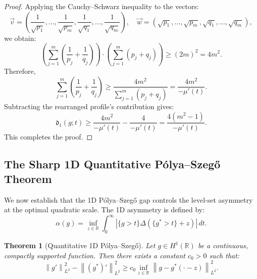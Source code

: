 \documentclass[11pt]{article}
\newtheorem{theorem}{Theorem}[section]
\theoremstyle{definition}
\newcommand{\R}{\mathbb R}
\newcommand{\norm}[1]{\left\|#1\right\|}
\newcommand{\abs}[1]{\left|#1\right|}
\begin{document}
\begin{proof}
Applying the Cauchy--Schwarz inequality to the vectors:
\begin{equation}
\vec{v} = \left( \frac{1}{\sqrt{p_1}}, \dots, \frac{1}{\sqrt{p_m}}, \frac{1}{\sqrt{q_1}}, \dots, \frac{1}{\sqrt{q_m}} \right), \quad \vec{w} = \left( \sqrt{p_1}, \dots, \sqrt{p_m}, \sqrt{q_1}, \dots, \sqrt{q_m} \right),
\end{equation}
we obtain:
\begin{equation}
\left( \sum_{j=1}^m \left( \frac{1}{p_j} + \frac{1}{q_j} \right) \right) \cdot \left( \sum_{j=1}^m (p_j + q_j) \right) \ge (2m)^2 = 4m^2.
\end{equation}
Therefore,
\begin{equation}
\sum_{j=1}^m \left( \frac{1}{p_j} + \frac{1}{q_j} \right) \ge \frac{4m^2}{\sum_{j=1}^m (p_j + q_j)} = \frac{4m^2}{-\mu'(t)}.
\end{equation}
Subtracting the rearranged profile's contribution gives:
\begin{equation}
\mathfrak{d}_1(g; t) \ge \frac{4m^2}{-\mu'(t)} - \frac{4}{-\mu'(t)} = \frac{4(m^2 - 1)}{-\mu'(t)}.
\end{equation}
This completes the proof.
\end{proof}

\subsection{The Sharp 1D Quantitative Pólya--Szegő Theorem}

We now establish that the 1D Pólya--Szegő gap controls the level-set asymmetry at the optimal quadratic scale. The 1D asymmetry is defined by:
\begin{equation}
\alpha(g) = \inf_{z\in\R} \int_0^\infty \abs{ \{g > t\} \Delta ( \{g^* > t\} + z ) } \, dt.
\end{equation}

\begin{theorem}[Quantitative 1D Pólya--Szegő]\label{thm:1d-qps}
Let $g \in H^1(\R)$ be a continuous, compactly supported function. Then there exists a constant $c_0 > 0$ such that:
\begin{equation}
\norm{g'}_{L^2}^2 - \norm{(g^*)'}_{L^2}^2 \ge c_0 \inf_{z\in\R} \norm{g - g^*(\cdot - z)}_{L^2}^2.
\end{equation}
\end{theorem}
\end{document}
